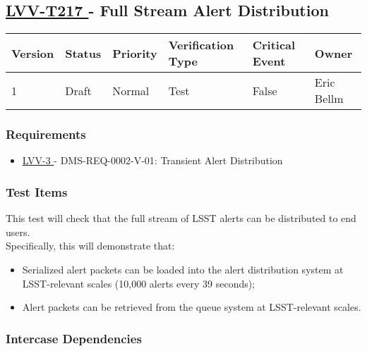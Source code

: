 \subsection{ \href{https://jira.lsstcorp.org/secure/Tests.jspa\#/testCase/LVV-T217}{ LVV-T217 }
             - Full Stream Alert Distribution }\label{lvv-t217}





\begin{longtable}[]{llllll}
\toprule
Version & Status & Priority & Verification Type & Critical Event & Owner
\\\midrule
1 & Draft & Normal & Test & False & Eric Bellm
\\\bottomrule
\end{longtable}

\subsubsection{Requirements}

\begin{itemize}

\item \href{https://jira.lsstcorp.org/browse/LVV-3}{ LVV-3 } - DMS-REQ-0002-V-01: Transient Alert Distribution

\end{itemize}


\subsubsection{Test Items}

This test will check that the full stream of LSST alerts can be
distributed to end users.\\[2\baselineskip]Specifically, this will
demonstrate that:

\begin{itemize}
\tightlist
\item
  Serialized alert packets can be loaded into the alert distribution
  system at LSST-relevant scales (10,000 alerts every 39 seconds);
\item
  Alert packets can be retrieved from the queue system at LSST-relevant
  scales.
\end{itemize}





\subsubsection{Intercase Dependencies}

